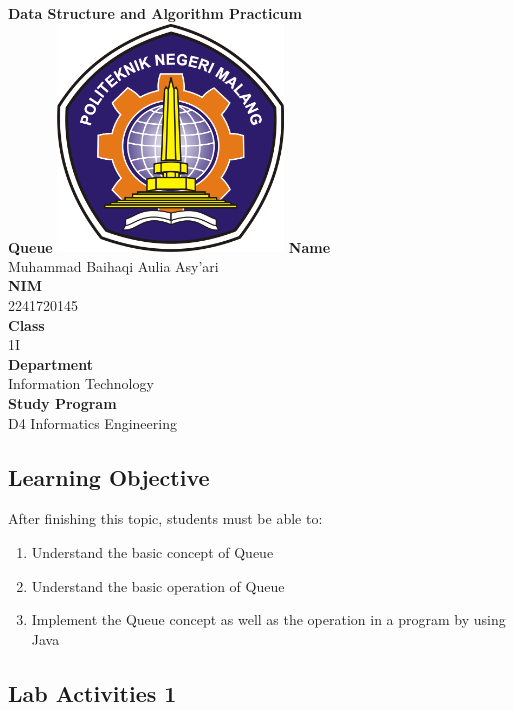 \documentclass[12pt,titlepage]{article}
\newcommand{\vSubject}{Data Structure and Algorithm Practicum}
\newcommand{\vSubtitle}{Queue}
\newcommand{\vName}{Muhammad Baihaqi Aulia Asy'ari}
\newcommand{\vNIM}{2241720145}
\newcommand{\vClass}{1I}
\newcommand{\vDepartment}{Information Technology}
\newcommand{\vStudyProgram}{D4 Informatics Engineering}
\begin{document}
\begin{titlepage}
    \centering
    \vfill
    {\bfseries\LARGE
        \vSubject\\
        \vskip0.25cm
        \vSubtitle
    }
    \vfill
    \includegraphics[width=6cm]{images/polinema-logo.png}
    \vfill
    {
        \textbf{Name}\\
        \vName\\
        \vskip0.5cm
        \textbf{NIM}\\
        \vNIM\\
        \vskip0.5cm
        \textbf{Class}\\
        \vClass\\
        \vskip0.5cm
        \textbf{Department}\\
        \vDepartment\\
        \vskip0.5cm
        \textbf{Study Program}\\
        \vStudyProgram
    }
\end{titlepage}

\newpage

\setcounter{section}{1}
\subsection{Learning Objective}
After finishing this topic, students must be able to:
\begin{enumerate}
    \item Understand the basic concept of Queue
    \item Understand the basic operation of Queue
    \item Implement the Queue concept as well as the operation in a program by using Java
\end{enumerate}

\subsection{Lab Activities 1}
\end{document}
